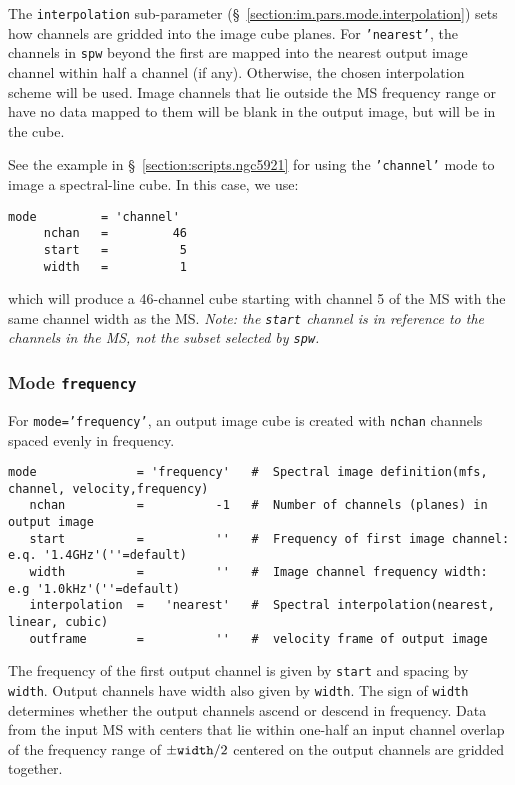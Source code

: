 The {\tt interpolation} sub-parameter
(\S~\ref{section:im.pars.mode.interpolation}) sets how channels are
gridded into the image cube planes.  For {\tt 'nearest'}, the
channels in {\tt spw} beyond the first are mapped
into the nearest output image channel within half a channel (if
any).  Otherwise, the chosen interpolation scheme will be used.
Image channels that lie outside the MS frequency range or
have no data mapped to them will be blank in the output image,
but will be in the cube.  

See the example in \S~\ref{section:scripts.ngc5921} for using the {\tt 'channel'}
mode to image a spectral-line cube. In this case, we use:
\small
\begin{verbatim}
mode         = 'channel'       
     nchan   =         46   
     start   =          5   
     width   =          1   
\end{verbatim}
\normalsize
which will produce a 46-channel cube starting with channel 5 of the MS
with the same channel width as the MS.  {\em Note: the {\tt start}
channel is in reference to the channels in the MS, not the subset
selected by {\tt spw}.}

\subsubsection{Mode {\tt frequency} }
\label{section:im.pars.mode.frequency}

For {\tt mode='frequency'}, an output image cube is created
with {\tt nchan} channels spaced evenly in frequency.
\small
\begin{verbatim}
mode              = 'frequency'   #  Spectral image definition(mfs, channel, velocity,frequency)
   nchan          =          -1   #  Number of channels (planes) in output image
   start          =          ''   #  Frequency of first image channel: e.q. '1.4GHz'(''=default)
   width          =          ''   #  Image channel frequency width: e.g '1.0kHz'(''=default)
   interpolation  =   'nearest'   #  Spectral interpolation(nearest, linear, cubic)
   outframe       =          ''   #  velocity frame of output image
\end{verbatim}
\normalsize
The frequency of the first output channel is given by {\tt start}
and spacing by {\tt width}.  Output channels have width also given by {\tt width}.
The sign of {\tt width}
determines whether the output channels ascend or descend in
frequency.  Data from the input MS with centers that lie within one-half an input
channel overlap of the frequency range of $\pm{\tt width}/2$ centered
on the output channels are gridded together.  

